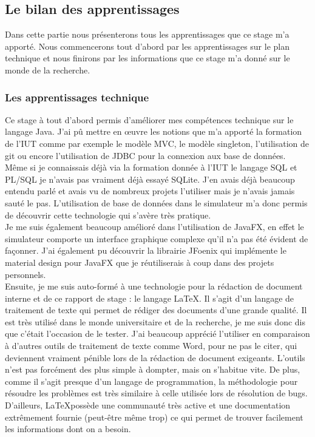 \subsection{Le bilan des apprentissages}
Dans cette partie nous présenterons tous les apprentissages que ce stage m'a apporté. Nous commencerons tout d'abord par les apprentissages sur le plan technique et nous finirons par les informations que ce stage m'a donné sur le monde de la recherche.

\subsubsection{Les apprentissages technique}
Ce stage à tout d'abord permis d'améliorer mes compétences technique sur le langage Java. J'ai pû mettre en œuvre les notions que m'a apporté la formation de l'IUT comme par exemple le modèle MVC, le modèle singleton, l'utilisation de git ou encore l'utilisation de JDBC pour la connexion aux base de données.\\

Même si je connaissais déjà via la formation donnée à l'IUT le langage SQL et PL/SQL je n'avais pas vraiment déjà essayé SQLite. J'en avais déjà beaucoup entendu parlé et avais vu de nombreux projets l'utiliser mais je n'avais jamais sauté le pas. L'utilisation de base de données dans le simulateur m'a donc permis de découvrir cette technologie qui s'avère très pratique.\\

Je me suis également beaucoup amélioré dans l'utilisation de JavaFX, en effet le simulateur comporte un interface graphique complexe qu'il n'a pas été évident de façonner. J'ai également pu découvrir la librairie JFoenix qui implémente le material design pour JavaFX que je réutiliserais à coup dans des projets personnels.\\

Ensuite, je me suis auto-formé à une technologie pour la rédaction de document interne et de ce rapport de stage : le langage \LaTeX. Il s'agit d'un langage de traitement de texte qui permet de rédiger des documents d'une grande qualité. Il est très utilisé dans le monde universitaire et de la recherche, je me suis donc dis que c'était l'occasion de le tester. J'ai beaucoup apprécié l'utiliser en comparaison à d'autres outils de traitement de texte comme Word, pour ne pas le citer, qui deviennent vraiment pénible lors de la rédaction de document exigeants. L'outils n'est pas forcément des plus simple à dompter, mais on s'habitue vite. De plus, comme il s'agit presque d'un langage de programmation, la méthodologie pour résoudre les problèmes est très similaire à celle utilisée lors de résolution de bugs. D'ailleurs, \LaTeX possède une communauté très active et une documentation extrêmement fournie (peut-être même trop) ce qui permet de trouver facilement les informations dont on a besoin.\\

